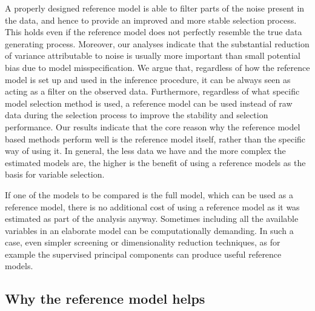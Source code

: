 \documentclass[a4]{article}
\theoremstyle{definition}
\begin{document}
A properly designed reference model is able to filter parts of the
noise present in the data, and hence to provide an improved and more
stable selection process. This holds even if the reference model does
not perfectly resemble the true data generating process. Moreover, our
analyses indicate that the substantial reduction of variance
attributable to noise is usually more important than small potential
bias due to model misspecification.  We argue that, regardless of how
the reference model is set up and used in the inference procedure, it
can be always seen as acting as a filter on the observed
data. Furthermore, regardless of what specific model selection method
is used, a reference model can be used instead of raw data during the
selection process to improve the stability and selection
performance. Our results indicate that the core reason why the
reference model based methods perform well is the reference model
itself, rather than the specific way of using it.  In general, the
less data we have and the more complex the estimated models are, the
higher is the benefit of using a reference models as the basis for
variable selection.

If one of the models to be compared is the full model, which can be
used as a reference model, there is no additional cost of using a
reference model as it was estimated as part of the analysis anyway.
Sometimes including all the available variables in an
elaborate model can be computationally demanding.  In such a
case, even simpler screening or dimensionality reduction techniques,
as for example the supervised principal components
\citep{bair2006prediction,piironen2018} can produce useful reference
models.


\hypertarget{reference-model-approach}{
\subsection{Why the reference model helps}\label{reference-model-approach}}
 
\end{document}
